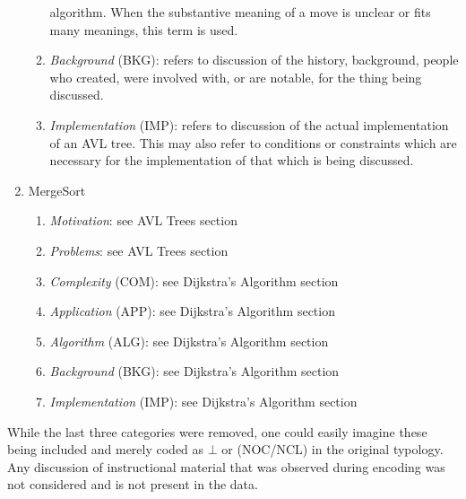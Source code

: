 \documentclass[conference]{IEEEtran}
\begin{document}
\begin{enumerate}
\begin{enumerate}
        algorithm. When the substantive meaning of a move is unclear or fits
        many meanings, this term is used.
      \item \emph{Background} (BKG): refers to discussion of the history,
        background, people who created, were involved with, or are notable,
        for the thing being discussed.
      \item \emph{Implementation} (IMP): refers to discussion of the actual
        implementation of an AVL tree. This may also refer to conditions or
        constraints which are necessary for the implementation of that which
        is being discussed.
    \end{enumerate}
  \item{MergeSort}
    \begin{enumerate}
      \item \emph{Motivation}: see AVL Trees section
      \item \emph{Problems}: see AVL Trees section
      \item \emph{Complexity} (COM): see Dijkstra's Algorithm section
      \item \emph{Application} (APP): see Dijkstra's Algorithm section
      \item \emph{Algorithm} (ALG): see Dijkstra's Algorithm section
      \item \emph{Background} (BKG): see Dijkstra's Algorithm section
      \item \emph{Implementation} (IMP): see Dijkstra's Algorithm section
    \end{enumerate}
  \end{enumerate}

While the last three categories were removed, one could easily
imagine these being included and merely coded as $\bot$ or (NOC/NCL) in the original
typology. Any discussion of instructional material that was observed during
encoding was not considered and is not present in the data.
\end{document}
